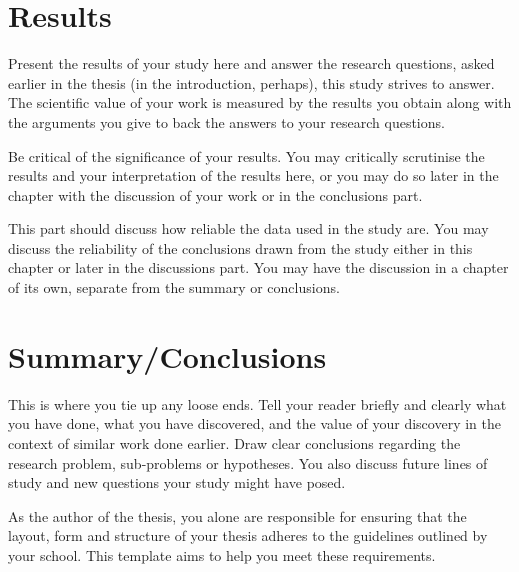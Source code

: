 \documentclass[english, 12pt, a4paper, elec, utf8, a-2b, online]{aaltothesis}
\begin{document}
\clearpage

\section{Results}

Present the results of your study here and answer the research questions, asked
earlier in the thesis (in the introduction, perhaps), this study strives to
answer. The scientific value of your work is measured by the results you obtain
along with the arguments you give to back the answers to your research
questions.

Be critical of the significance of your results. You may critically scrutinise
the results and your interpretation of the results here, or you may do so later
in the chapter with the discussion of your work or in the conclusions part.

This part should discuss how reliable the data used in the study are. You may
discuss the reliability of the conclusions drawn from the study either in this
chapter or later in the discussions part. You may have the discussion in a
chapter of its own, separate from the summary or conclusions.


\clearpage

\section{Summary/Conclusions}
\label{sec:summary}

This is where you tie up any loose ends. Tell your reader briefly and clearly
what you have done, what you have discovered, and the value of your discovery
in the context of similar work done earlier. Draw clear conclusions regarding
the research problem, sub-problems or hypotheses. You also discuss future lines
of study and new questions your study might have posed.

As the author of the thesis, you alone are responsible for ensuring that the
layout, form and structure of your thesis adheres to the guidelines outlined by
your school. This template aims to help you meet these requirements.



\clearpage
\thesisbibliography
\end{document}
